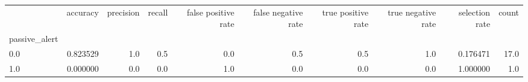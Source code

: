 \begin{tabular}{lrrrrrrrrr}
\toprule
{} &  accuracy &  precision &  recall &  false positive rate &  false negative rate &  true positive rate &  true negative rate &  selection rate &  count \\
passive\_alert &           &            &         &                      &                      &                     &                     &                 &        \\
\midrule
0.0           &  0.823529 &        1.0 &     0.5 &                  0.0 &                  0.5 &                 0.5 &                 1.0 &        0.176471 &   17.0 \\
1.0           &  0.000000 &        0.0 &     0.0 &                  1.0 &                  0.0 &                 0.0 &                 0.0 &        1.000000 &    1.0 \\
\bottomrule
\end{tabular}
